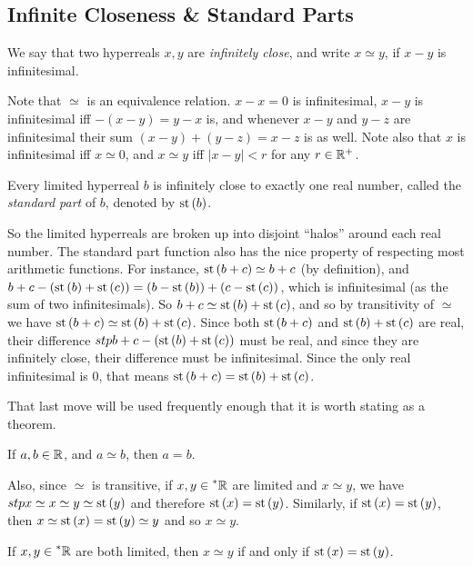 \subsection{Infinite Closeness \& Standard Parts}
\begin{defn}
    We say that two hyperreals $x, y$ are \textit{infinitely close}, and write $x \simeq y$, if $x - y$ is infinitesimal.
\end{defn}

Note that $\simeq$ is an equivalence relation. $x - x = 0$ is infinitesimal, $x - y$ is infinitesimal iff $-(x - y) = y - x$ is, and whenever $x - y$ and $y - z$ are infinitesimal their sum $(x - y) + (y - z) = x - z$ is as well. Note also that $x$ is infinitesimal iff $x \simeq 0$, and $x \simeq y$ iff $|x - y| < r$ for any $r \in \mathbb{R}^+$.

\begin{thm}
    Every limited hyperreal $b$ is infinitely close to exactly one real number, called the \textit{standard part} of $b$, denoted by $\operatorname{st}\left(b\right)$.
\end{thm}

So the limited hyperreals are broken up into disjoint ``halos'' around each real number. The standard part function also has the nice property of respecting most arithmetic functions. For instance, $\operatorname{st}\left(b + c\right) \simeq b + c$ (by definition), and $b + c - (\operatorname{st}\left(b\right) + \operatorname{st}\left(c\right)) = (b - \operatorname{st}\left(b\right)) + (c - \operatorname{st}\left(c\right))$, which is infinitesimal (as the sum of two infinitesimals). So $b + c \simeq \operatorname{st}\left(b\right) + \operatorname{st}\left(c\right)$, and so by transitivity of $\simeq$ we have $\operatorname{st}\left(b + c\right) \simeq \operatorname{st}\left(b\right) + \operatorname{st}\left(c\right)$. Since both $\operatorname{st}\left(b + c\right)$ and $\operatorname{st}\left(b\right) + \operatorname{st}\left(c\right)$ are real, their difference $stp{b + c} - (\operatorname{st}\left(b\right) + \operatorname{st}\left(c\right))$ must be real, and since they are infinitely close, their difference must be infinitesimal. Since the only real infinitesimal is $0$, that means $\operatorname{st}\left(b+c\right) = \operatorname{st}\left(b\right)+\operatorname{st}\left(c\right)$.

That last move will be used frequently enough that it is worth stating as a theorem.
\begin{thm}
    If $a, b \in \mathbb{R}$, and $a \simeq b$, then $a = b$.
\end{thm}

Also, since $\simeq$ is transitive, if $x, y \in \prescript{*}{}{\mathbb{R}}$ are limited and $x \simeq y$, we have $stp{x} \simeq x \simeq y \simeq \operatorname{st}\left(y\right)$ and therefore $\operatorname{st}\left(x\right) = \operatorname{st}\left(y\right)$. Similarly, if $\operatorname{st}\left(x\right) = \operatorname{st}\left(y\right)$, then $x \simeq \operatorname{st}\left(x\right) = \operatorname{st}\left(y\right) \simeq y$ and so $x \simeq y$.
\begin{corollary}
    If $x, y \in \prescript{*}{}{\mathbb{R}}$ are both limited, then $x \simeq y$ if and only if $\operatorname{st}\left(x\right) = \operatorname{st}\left(y\right)$.
\end{corollary}

